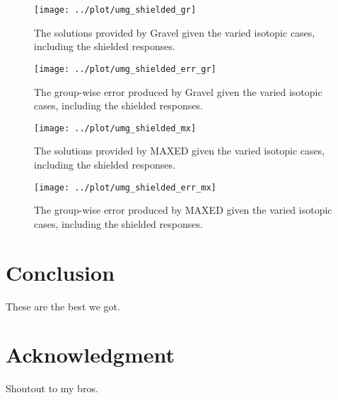 \documentclass[journal]{IEEEtran}
\begin{document}
\begin{figure}[h!tb]
  \centering
  \texttt{[image: ../plot/umg\_shielded\_gr]}
  \caption{The solutions provided by Gravel given the varied isotopic cases, including the shielded responses.}
  \label{fig:shielded_gr}
\end{figure}

\begin{figure}[h!tb]
  \centering
  \texttt{[image: ../plot/umg\_shielded\_err\_gr]}
  \caption{The group-wise error produced by Gravel given the varied isotopic cases, including the shielded responses.}
  \label{fig:shielded_err_gr}
\end{figure}

\begin{figure}[h!tb]
  \centering
  \texttt{[image: ../plot/umg\_shielded\_mx]}
  \caption{The solutions provided by MAXED given the varied isotopic cases, including the shielded responses.}
  \label{fig:shielded_mx}
\end{figure}

\begin{figure}[h!tb]
  \centering
  \texttt{[image: ../plot/umg\_shielded\_err\_mx]}
  \caption{The group-wise error produced by MAXED given the varied isotopic cases, including the shielded responses.}
  \label{fig:shielded_err_mx}
\end{figure}

\section{Conclusion}

These are the best we got.

 
\section*{Acknowledgment}

Shoutout to my bros.

\ifCLASSOPTIONcaptionsoff
  \newpage
\fi



\end{document}
